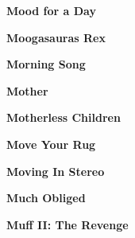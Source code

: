 \newline
\vspace{10pt} 
\begin{center}\textbf{Mood for a Day}\end{center}
\newline
\vspace{10pt} 
\begin{center}\textbf{Moogasauras Rex}\end{center}
\newline
\vspace{10pt} 
\begin{center}\textbf{Morning Song}\end{center}
\newline
\vspace{10pt} 
\begin{center}\textbf{Mother}\end{center}
\newline
\vspace{10pt} 
\begin{center}\textbf{Motherless Children}\end{center}
\newline
\vspace{10pt} 
\begin{center}\textbf{Move Your Rug}\end{center}
\newline
\vspace{10pt} 
\begin{center}\textbf{Moving In Stereo}\end{center}
\newline
\vspace{10pt} 
\begin{center}\textbf{Much Obliged}\end{center}
\newline
\vspace{10pt} 
\begin{center}\textbf{Muff II: The Revenge}\end{center}
\newline
\vspace{10pt} 

